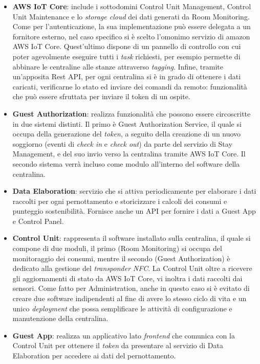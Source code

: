 \begin{itemize}
    \item \textbf{AWS IoT Core}: include i sottodomini Control Unit Management, Control Unit Maintenance e lo \textit{storage cloud} dei dati generati da Room Monitoring. Come per l'autenticazione, la sua implementazione può essere delegata a un fornitore esterno, nel caso specifico si è scelto l'omonimo servizio di amazon AWS IoT Core. Quest'ultimo dispone di un pannello di controllo con cui poter agevolmente eseguire tutti i \textit{task} richiesti, per esempio permette di abbinare le centraline alle stanze attraverso \textit{tagging}. Infine, tramite un'apposita Rest API, per ogni centralina si è in grado di ottenere i dati caricati, verificarne lo stato ed inviare dei comandi da remoto: funzionalità che può essere sfruttata per inviare il token di un ospite.
    \item \textbf{Guest Authorization}: realizza funzionalità che possono essere circoscritte in due sistemi distinti. Il primo è Guest Authorization Service, il quale si occupa della generazione del \textit{token}, a seguito della creazione di un nuovo soggiorno (eventi di \textit{check in} e \textit{check out}) da parte del servizio di Stay Management, e del suo invio verso la centralina tramite AWS IoT Core. Il secondo sistema verrà incluso come modulo all'interno del software della centralina.
    \item \textbf{Data Elaboration}: servizio che si attiva periodicamente per elaborare i dati raccolti per ogni pernottamento e storicizzare i calcoli dei consumi e punteggio sostenibilità. Fornisce anche un API per fornire i dati a Guest App e Control Panel.
    \item \textbf{Control Unit}: rappresenta il software installato sulla centralina, il quale si compone di due moduli, il primo (Room Monitoring) si occupa del monitoraggio dei consumi, mentre il secondo (Guest Authorization) è dedicato alla gestione del \textit{transponder NFC}. La Control Unit oltre a ricevere gli aggiornamenti di stato da AWS IoT Core, vi inoltra i dati raccolti dai sensori. Come fatto per Administration, anche in questo caso si è evitato di creare due software indipendenti al fine di avere lo stesso ciclo di vita e un unico \textit{deployment} che possa semplificare le attività di configurazione e manutenzione della centralina.
    \item \textbf{Guest App}: realizza un applicativo lato \textit{frontend} che comunica con la Control Unit per ottenere il \textit{token} da presentare al servizio di Data Elaboration per accedere ai dati del pernottamento.
\end{itemize}

